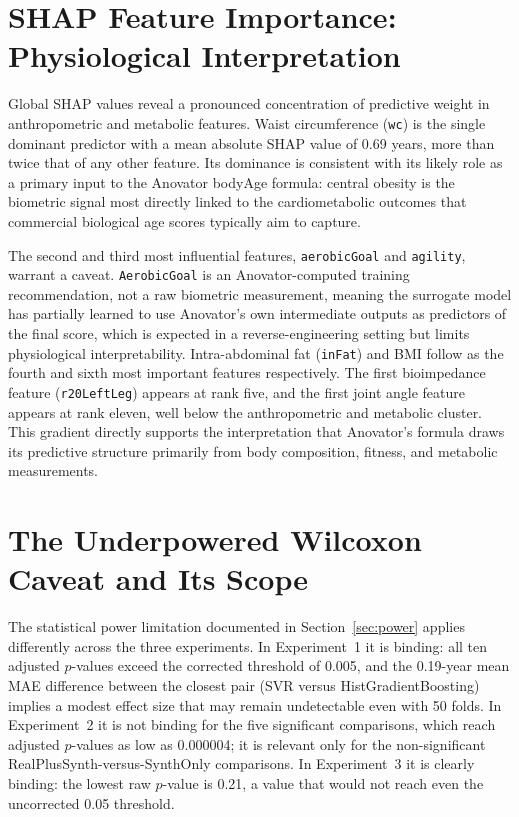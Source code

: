\documentclass[11pt,a4paper]{report}
\begin{document}
\section{SHAP Feature Importance: Physiological Interpretation}

Global SHAP values reveal a pronounced concentration of predictive weight in anthropometric and
metabolic features. Waist circumference (\texttt{wc}) is the single dominant predictor with a mean
absolute SHAP value of 0.69 years, more than twice that of any other feature. Its dominance is
consistent with its likely role as a primary input to the Anovator bodyAge formula: central obesity
is the biometric signal most directly linked to the cardiometabolic outcomes that commercial
biological age scores typically aim to capture.

The second and third most influential features, \texttt{aerobicGoal} and \texttt{agility},
warrant a caveat. \texttt{AerobicGoal} is an Anovator-computed training recommendation, not a raw
biometric measurement, meaning the surrogate model has partially learned to use Anovator's own
intermediate outputs as predictors of the final score, which is expected in a reverse-engineering
setting but limits physiological interpretability. Intra-abdominal fat (\texttt{inFat}) and BMI
follow as the fourth and sixth most important features respectively. The first bioimpedance feature
(\texttt{r20LeftLeg}) appears at rank five, and the first joint angle feature appears at rank
eleven, well below the anthropometric and metabolic cluster. This gradient directly supports the
interpretation that Anovator's formula draws its predictive structure primarily from body
composition, fitness, and metabolic measurements.

\section{The Underpowered Wilcoxon Caveat and Its Scope}

The statistical power limitation documented in Section~\ref{sec:power} applies differently across
the three experiments. In Experiment~1 it is binding: all ten adjusted $p$-values exceed the
corrected threshold of 0.005, and the 0.19-year mean MAE difference between the closest pair (SVR
versus HistGradientBoosting) implies a modest effect size that may remain undetectable even with 50
folds. In Experiment~2 it is not binding for the five significant comparisons, which reach adjusted
$p$-values as low as 0.000004; it is relevant only for the non-significant
RealPlusSynth-versus-SynthOnly comparisons. In Experiment~3 it is clearly binding: the lowest raw
$p$-value is 0.21, a value that would not reach even the uncorrected 0.05 threshold.
\end{document}
